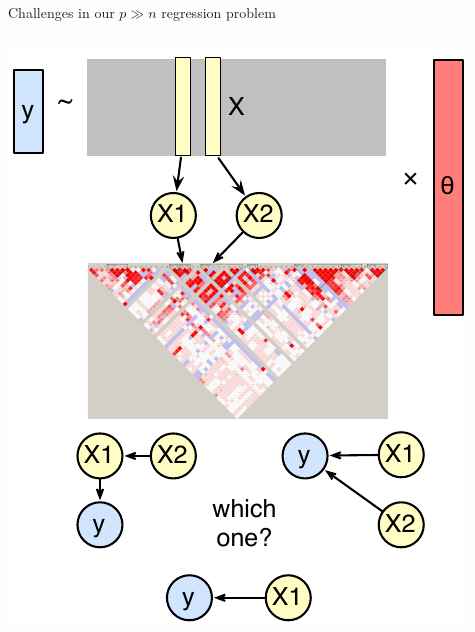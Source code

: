 \documentclass[
  ignorenonframetext,
  aspectratio=169]{beamer}
\begin{document}
\begin{frame}{Challenges in our \(p\gg n\) regression problem}
\begin{columns}[T]
\begin{column}{.45\textwidth}
{\begin{center}\includegraphics[width=.7\linewidth]{Vis/intractability2} \end{center}


}

\normalsize
\end{column}
\end{columns}

\scriptsize

\normalsize

\scriptsize

\normalsize

\scriptsize

\normalsize
\end{frame}
\end{document}
